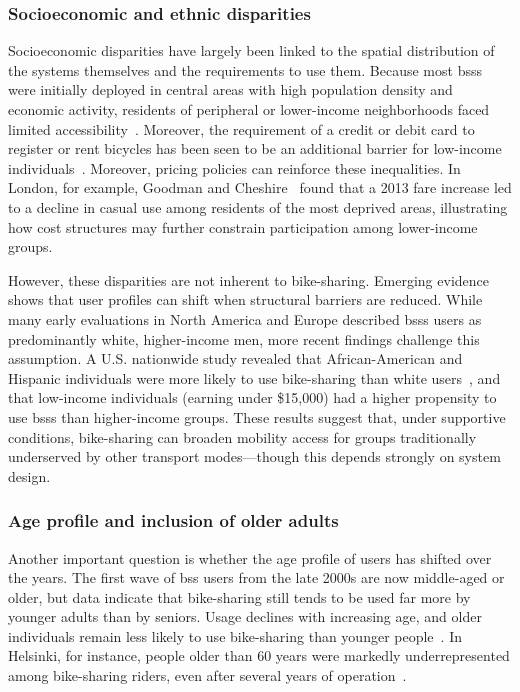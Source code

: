     \subsubsection{Socioeconomic and ethnic disparities}

    Socioeconomic disparities have largely been linked to the spatial distribution of the systems themselves and the requirements to use them. Because most \acp{bss} were initially deployed in central areas with high population density and economic activity, residents of peripheral or lower-income neighborhoods faced limited accessibility~\cite{Ogilvie2012, Goodman2014, Willberg2021}. Moreover, the requirement of a credit or debit card to register or rent bicycles has been seen to be an additional barrier for low-income individuals~\cite{Ricci2015, Ogilvie2012}. Moreover, pricing policies can reinforce these inequalities. In London, for example, Goodman and Cheshire~\cite{Goodman2014} found that a 2013 fare increase led to a decline in casual use among residents of the most deprived areas, illustrating how cost structures may further constrain participation among lower-income groups.

    However, these disparities are not inherent to bike-sharing. Emerging evidence shows that user profiles can shift when structural barriers are reduced. While many early evaluations in North America and Europe described \acp{bss} users as predominantly white, higher-income men, more recent findings challenge this assumption. A U.S. nationwide study revealed that African-American and Hispanic individuals were more likely to use bike-sharing than white users~\cite{Yu2024}, and that low-income individuals (earning under \$15,000) had a higher propensity to use \acp{bss} than higher-income groups. These results suggest that, under supportive conditions, bike-sharing can broaden mobility access for groups traditionally underserved by other transport modes—though this depends strongly on system design.


    \subsubsection{Age profile and inclusion of older adults}

    Another important question is whether the age profile of users has shifted over the years. The first wave of \ac{bss} users from the late 2000s are now middle-aged or older, but data indicate that bike-sharing still tends to be used far more by younger adults than by seniors. Usage declines with increasing age, and older individuals remain less likely to use bike-sharing than younger people~\cite{Yu2024}. In Helsinki, for instance, people older than 60 years were markedly underrepresented among bike-sharing riders, even after several years of operation~\cite{Willberg2021}. 

